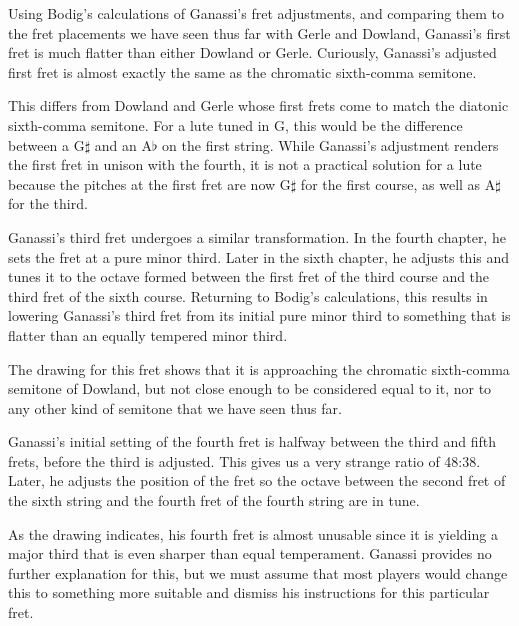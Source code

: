 Using Bodig's calculations of Ganassi's fret adjustments, and comparing them to the
fret placements we have seen thus far with Gerle and Dowland, Ganassi's first fret is
much flatter than either Dowland or Gerle. Curiously, Ganassi's adjusted first fret is
almost exactly the same as the chromatic sixth-comma semitone.

This differs from Dowland and Gerle whose first frets come to match the diatonic
sixth-comma semitone. For a lute tuned in G, this would be the difference between a
G$\sharp$ and an A$\flat$ on the first string. While Ganassi's adjustment renders
the first fret in unison with the fourth, it is not a practical solution for a lute
because the pitches at the first fret are now G$\sharp$ for the first course, as well
as A$\sharp$ for the third.

Ganassi's third fret undergoes a similar transformation. In the fourth chapter, he
sets the fret at a pure minor third. Later in the sixth chapter, he adjusts this
and tunes it to the octave formed between the first fret of the third course and the
third fret of the sixth course. Returning to Bodig's calculations, this results in
lowering Ganassi's third fret from its initial pure minor third to something that is
flatter than an equally tempered minor third.

The drawing for this fret shows that it is approaching the chromatic sixth-comma semitone
of Dowland, but not close enough to be considered equal to it, nor to any other kind of
semitone that we have seen thus far.

Ganassi's initial setting of the fourth fret is halfway between the third and
fifth frets, before the third is adjusted. This gives us a very strange ratio of
48:38. Later, he adjusts the position of the fret so the octave between the second
fret of the sixth string and the fourth fret of the fourth string are in tune.

As the drawing indicates, his fourth fret is almost unusable since it is yielding a
major third that is even sharper than equal temperament. Ganassi provides no further
explanation for this, but we must assume that most players would change this to
something more suitable and dismiss his instructions for this particular fret.

